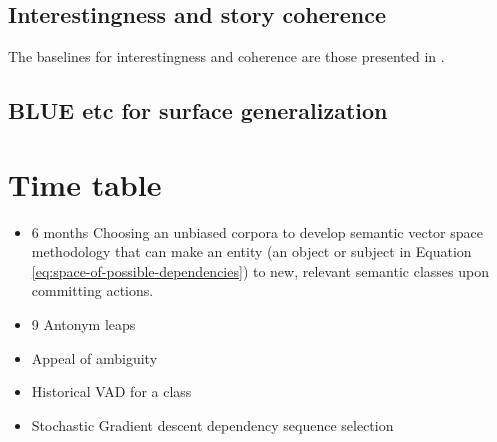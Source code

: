 \documentclass{article}
\begin{document}
		\subsection{Interestingness and story coherence}
		The baselines for interestingness and coherence are those presented in \citet{mcintyre-2009-learning-to-tell-tales-a-data-driven-approach-to-story-generation, mcintyre-2010-plot-induction-and-evolutionary-search-for-story-generation}.  
		\citet{xu-2018-a-skeleton-based-model-for-promoting-coherence-among-sentences-in-narrative-story-generation}
		\subsection{BLUE etc for surface generalization}
	
	\section{Time table}
		\begin{itemize}
			\item 6 months Choosing an unbiased corpora to develop semantic vector space methodology that can make an entity (an object or subject in Equation \ref{eq:space-of-possible-dependencies}) to new, relevant semantic classes upon committing actions.
			
			\item 9 Antonym leaps
			\item Appeal of ambiguity 
			\item Historical VAD for a class 
			\item Stochastic Gradient descent dependency sequence selection
			
		\end{itemize}
	
	
	
\end{document}
